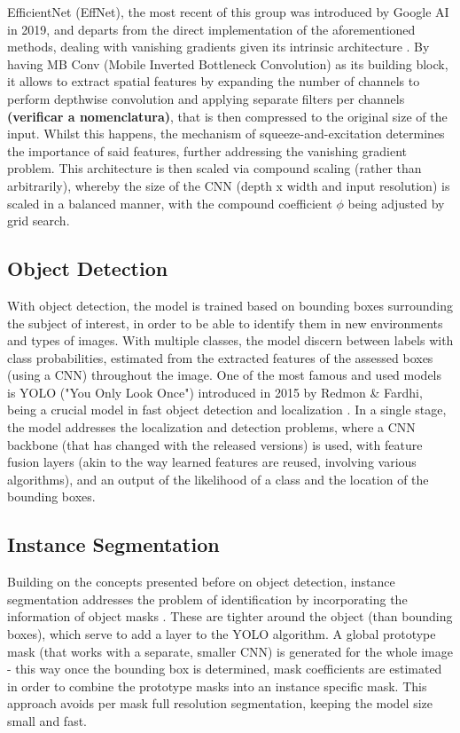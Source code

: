 \documentclass[conference]{IEEEtran}
\begin{document}
EfficientNet (EffNet), the most recent of this group was introduced by Google AI in 2019, and departs from the direct implementation of the aforementioned methods, dealing with vanishing gradients given its intrinsic architecture \cite{EffienctNet}. By having MB Conv (Mobile Inverted Bottleneck Convolution) as its building block, it allows to extract spatial features by expanding the number of channels to perform depthwise convolution and applying separate filters per channels \textbf{(verificar a nomenclatura)}, that is then compressed to the original size of the input. Whilst this happens, the mechanism of squeeze-and-excitation determines the importance of said features, further addressing the vanishing gradient problem. This architecture is then scaled via compound scaling (rather than arbitrarily), whereby the size of the CNN (depth x width and input resolution) is scaled in a balanced manner, with the compound coefficient $\phi$ being adjusted by grid search.

\subsection{Object Detection}

With object detection, the model is trained based on bounding boxes surrounding the subject of interest, in order to be able to identify them in new environments and types of images. With multiple classes, the model discern between labels with class probabilities, estimated from the extracted features of the assessed boxes (using a CNN) throughout the image. One of the most famous and used models is YOLO ("You Only Look Once") introduced in 2015 by Redmon \& Fardhi, being a crucial model in fast object detection and localization \cite{YOLO}. In a single stage, the model addresses the localization and detection problems, where a CNN backbone (that has changed with the released versions) is used, with feature fusion layers (akin to the way learned features are reused, involving various algorithms), and an output of the likelihood of a class and the location of the bounding boxes.

\subsection{Instance Segmentation}

Building on the concepts presented before on object detection, instance segmentation addresses the problem of identification by incorporating the information of object masks \cite{YOLOSeg}. These are tighter around the object (than bounding boxes), which serve to add a layer to the YOLO algorithm. A global prototype mask (that works with a separate, smaller CNN) is generated for the whole image - this way once the bounding box is determined, mask coefficients are estimated in order to combine the prototype masks into an instance specific mask. This approach avoids per mask full resolution segmentation, keeping the model size small and fast.
\end{document}
